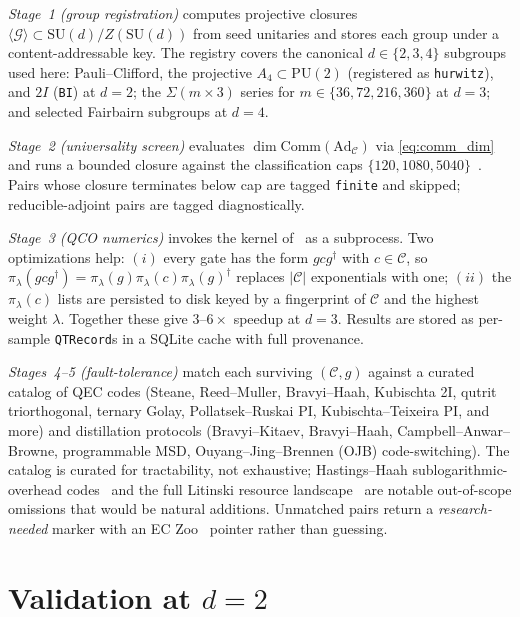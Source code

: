 \documentclass[twocolumn,superscriptaddress,showpacs,nofootinbib,notitlepage,preprintnumbers,secnumarabic,amssymb, nobibnotes, aps, prd]{revtex4-2}
\begin{document}
\emph{Stage~1 (group registration)} computes projective closures $\langle\mathcal{G}\rangle\subset\mathrm{SU}(d)/Z(\mathrm{SU}(d))$ from seed unitaries and stores each group under a content-addressable key. The registry covers the canonical $d\in\{2,3,4\}$ subgroups used here: Pauli--Clifford, the projective $A_4\subset\mathrm{PU}(2)$ (registered as \texttt{hurwitz}), and $2I$ (\texttt{BI}) at $d=2$; the $\Sigma(m\!\times\!3)$ series for $m\in\{36,72,216,360\}$ at $d=3$; and selected Fairbairn subgroups at $d=4$.

\emph{Stage~2 (universality screen)} evaluates $\dim\mathrm{Comm}(\mathrm{Ad}_\mathcal{C})$ via \cref{eq:comm_dim} and runs a bounded closure against the classification caps $\{120,1080,5040\}$~\cite{Blichfeldt:1917,Fairbairn:1964,Flyvbjerg:1985,HananyHe:2001,GrimusLudl:2010}. Pairs whose closure terminates below cap are tagged \texttt{finite} and skipped; reducible-adjoint pairs are tagged diagnostically.

\emph{Stage~3 (QCO numerics)} invokes the kernel of~\cite{Slowik:2025qco} as a subprocess. Two optimizations help: $(i)$ every gate has the form $g c g^\dagger$ with $c\in\mathcal{C}$, so $\pi_\lambda(g c g^\dagger) = \pi_\lambda(g)\pi_\lambda(c)\pi_\lambda(g)^\dagger$ replaces $|\mathcal{C}|$ exponentials with one; $(ii)$ the $\pi_\lambda(c)$ lists are persisted to disk keyed by a fingerprint of $\mathcal{C}$ and the highest weight $\lambda$. Together these give $3\text{--}6\times$ speedup at $d=3$. Results are stored as per-sample \texttt{QTRecord}s in a SQLite cache with full provenance.

\emph{Stages~4--5 (fault-tolerance)} match each surviving $(\mathcal{C},g)$ against a curated catalog of QEC codes (Steane, Reed--Muller, Bravyi--Haah, Kubischta 2I, qutrit triorthogonal, ternary Golay, Pollatsek--Ruskai PI, Kubischta--Teixeira PI, and more) and distillation protocols (Bravyi--Kitaev, Bravyi--Haah, Campbell--Anwar--Browne, programmable MSD, Ouyang--Jing--Brennen (OJB) code-switching). The catalog is curated for tractability, not exhaustive; Hastings--Haah sublogarithmic-overhead codes~\cite{HastingsHaah:2018} and the full Litinski resource landscape~\cite{Litinski:2019cheap} are notable out-of-scope omissions that would be natural additions. Unmatched pairs return a \emph{research-needed} marker with an EC Zoo~\cite{ecc_zoo} pointer rather than guessing.

\section{Validation at $d=2$}\label{sec:d2}
\end{document}
